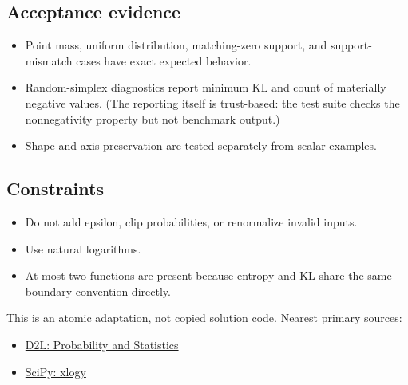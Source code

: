         \subsection{Acceptance evidence}

        \begin{evidencebox}
        \begin{itemize}
          \item Point mass, uniform distribution, matching-zero support, and support-mismatch cases have exact expected behavior.
  \item Random-simplex diagnostics report minimum KL and count of materially negative values. (The reporting itself is trust-based: the test suite checks the nonnegativity property but not benchmark output.)
  \item Shape and axis preservation are tested separately from scalar examples.
        \end{itemize}
        \end{evidencebox}

        \subsection{Constraints}

        \begin{itemize}
          \item Do not add epsilon, clip probabilities, or renormalize invalid inputs.
  \item Use natural logarithms.
  \item At most two functions are present because entropy and KL share the same boundary convention directly.
        \end{itemize}

        \begin{sourcebox}
        This is an atomic adaptation, not copied solution code. Nearest primary sources:
        \begin{itemize}
          \item \href{https://d2l.ai/chapter_preliminaries/probability.html}{D2L: Probability and Statistics}
  \item \href{https://docs.scipy.org/doc/scipy/reference/generated/scipy.special.xlogy.html}{SciPy: xlogy}
        \end{itemize}
        \end{sourcebox}
